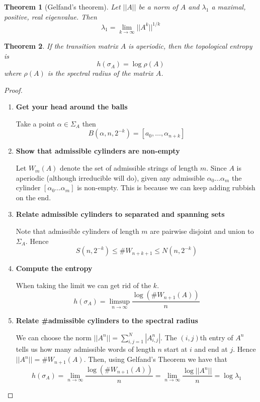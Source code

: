 \documentclass[11pt]{article}
\newcommand{\abs}[1]{|#1|}
\newcommand{\norm}[1]{||#1||}
\newtheorem{theorem}{Theorem}[section]
\begin{document}
\begin{theorem}[Gelfand's theorem]
Let $\norm{A}$ be a norm of $A$ and $\lambda_1$ a maximal, positive, real eigenvalue. Then
\[
	\lambda_1=\lim_{k\to\infty}\norm{A^k}^{1/k}
\]
\end{theorem}

\begin{theorem}
If the transition matrix $A$ is aperiodic, then the topological entropy is
\[
	h\left(\sigma_A\right)=\log\rho(A)
\]
where $\rho(A)$ is the spectral radius of the matrix $A$.
\end{theorem}

\begin{proof}
\begin{enumerate}
	\item \textbf{Get your head around the balls}
		
		Take a point $\alpha\in\Sigma_A$ then
		\[
			B(\alpha, n, 2^{-k})=[a_0, \dots, \alpha_{n+k}]
		\]
	\item \textbf{Show that admissible cylinders are non-empty}

		Let $W_m(A)$ denote the set of admissible strings of length $m$.
		Since $A$ is aperiodic (although irreducible will do), given any admissible $\alpha_0\dots\alpha_m$ the cylinder $\left[\alpha_0\dots\alpha_m\right]$ is non-empty.
		This is because we can keep adding rubbish on the end.
	\item \textbf{Relate admissible cylinders to separated and spanning sets}

		Note that admissible cylinders of length $m$ are pairwise disjoint and union to $\Sigma_A$.
		Hence
		\[
			S(n, 2^{-k}) \leq \#W_{n+k+1} \leq N(n, 2^{-k})
		\]
	\item \textbf{Compute the entropy}

		When taking the limit we can get rid of the $k$.
		\[
			h\left(\sigma_A\right)= \limsup_{n\to\infty}\frac{\log(\#W_{n+1}(A))}{n}
		\]
	\item \textbf{Relate \#admissible cylinders to the spectral radius}

		We can choose the norm $\norm{A^n}=\sum_{i,j =1}^N \abs{A^n_{i,j}}$.
		The $(i,j)$th entry of $A^n$ tells us how many admissible words of length $n$ start at $i$ and end at $j$.
		Hence $\norm{A^n}=\#W_{n+1}(A)$.
		Then, using Gelfand's Theorem we have that
		\[
			h\left(\sigma_A\right)=\lim_{n\to\infty}\frac{\log(\#W_{n+1}(A))}{n}=\lim_{n\to\infty}\frac{\log\norm{A^n}}{n}=\log\lambda_1
		\]
\end{enumerate}
\end{proof}
\end{document}
